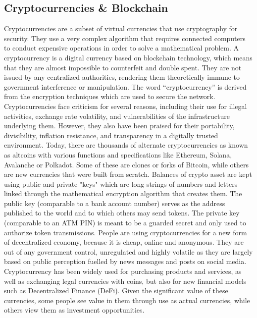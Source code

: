\documentclass{article}
\begin{document}
	\subsection{Cryptocurrencies \& Blockchain}
	
	Cryptocurrencies are a subset of virtual currencies that use cryptography for security. They use a very complex algorithm that requires connected computers to conduct expensive operations in order to solve a mathematical problem. A cryptocurrency is a digital currency based on blockchain technology, which means that they are almost impossible to counterfeit and double spent. They are not issued by any centralized authorities, rendering them theoretically immune to government interference or manipulation. The word “cryptocurrency” is derived from the encryption techniques which are used to secure the network. Cryptocurrencies face criticism for several reasons, including their use for illegal activities, exchange rate volatility, and vulnerabilities of the infrastructure underlying them. However, they also have been praised for their portability, divisibility, inflation resistance, and transparency in a digitally trusted environment. Today, there are thousands of alternate cryptocurrencies as known as altcoins with various functions and specifications like Ethereum, Solana, Avalanche or Polkadot. Some of these are clones or forks of Bitcoin, while others are new currencies that were built from scratch. Balances of crypto asset are kept using public and private "keys" which are long strings of numbers and letters linked through the mathematical encryption algorithm that creates them. The public key (comparable to a bank account number) serves as the address published to the world and to which others may send tokens.
	The private key (comparable to an ATM PIN) is meant to be a guarded secret and only used to authorize token transmissions. People are using cryptocurrencies for a new form of decentralized economy, because it is cheap, online and anonymous. They are out of any government control, unregulated and highly volatile as they are largely based on public perception fuelled by news messages and posts on social media. Cryptocurrency has been widely used for purchasing products and services, as well as exchanging legal currencies with coins, but also for new financial models such as Decentralized Finance (DeFi). Given the significant value of these currencies, some people see value in them through use as actual currencies, while others view them as investment opportunities. \\
	
\end{document}
